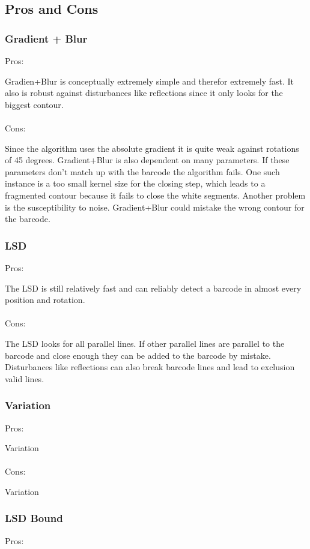\subsection{Pros and Cons}\label{sec:ProCon}
\subsubsection*{Gradient + Blur}
Pros:

Gradien+Blur is conceptually extremely simple and therefor extremely fast. It also is robust against disturbances like reflections since it only looks for the biggest contour.
\\
\\
Cons:

Since the algorithm uses the absolute gradient it is quite weak against rotations of 45 degrees. Gradient+Blur is also dependent on many parameters. If these parameters don't match up with the barcode the algorithm fails. One such instance is a too small kernel size for the closing step, which leads to a fragmented contour because it fails to close the white segments. Another problem is the susceptibility to noise. Gradient+Blur could mistake the wrong contour for the barcode.

\subsubsection*{LSD}
Pros:

The LSD is still relatively fast and can reliably detect a barcode in almost every position and rotation.
\\
\\
Cons:

The LSD looks for all parallel lines. If other parallel lines are parallel to the barcode and close enough they can be added to the barcode by mistake. Disturbances like reflections can also break barcode lines and lead to exclusion valid lines.

\subsubsection*{Variation}
Pros:

Variation
\\
\\
Cons:

Variation

\subsubsection*{LSD Bound}
Pros:

